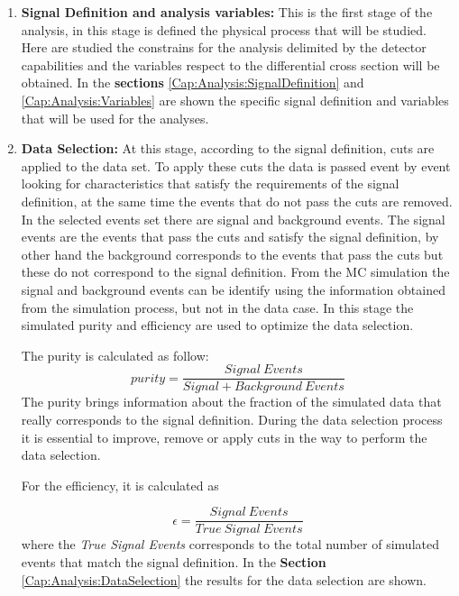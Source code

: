 \begin{enumerate}
    \item \textbf{Signal Definition and analysis variables:} This is the first stage of the analysis, in this stage is defined the physical process that will be studied. Here are studied the constrains for the analysis delimited by the detector capabilities and the variables respect to the differential cross section will be obtained. In the \textbf{sections} \ref{Cap:Analysis:SignalDefinition} and \ref{Cap:Analysis:Variables} are shown the specific signal definition and variables that will be used for the analyses. 

    \item \textbf{Data Selection:} At this stage, according to the signal definition, cuts are applied to the data set. To apply these cuts the data is passed event by event looking for characteristics that satisfy the requirements of the signal definition, at the same time the events that do not pass the cuts are removed. In the selected events set there are signal and background events. The signal events are the events that pass the cuts and satisfy the signal definition, by other hand the background corresponds to the events that pass the cuts but these do not correspond to the signal definition. From the MC simulation the signal and background events can be identify using the information obtained from the simulation process, but not in the data case. In this stage the simulated purity and efficiency are used to optimize the data selection. 

    The purity is calculated as follow:
    \begin{equation}
        purity=\frac{Signal\ Events}{Signal+Background\ Events}
        \label{eq:Analysis:Purity}
    \end{equation}
    The purity brings information about the fraction of the simulated data that really corresponds to the signal definition. During the data selection process it is essential to improve, remove or apply cuts in the way to perform the data selection.

    For the efficiency, it is calculated as 
    
    \begin{equation}
        \epsilon=\frac{Signal\ Events}{True\ Signal\ Events}
        \label{eq:Analysis:efficiency}
    \end{equation}
    where the \textit{True Signal Events} corresponds to the total number of simulated events that match the signal definition. 
    In the \textbf{Section} \ref{Cap:Analysis:DataSelection} the results for the data selection are shown. 


\end{enumerate}
